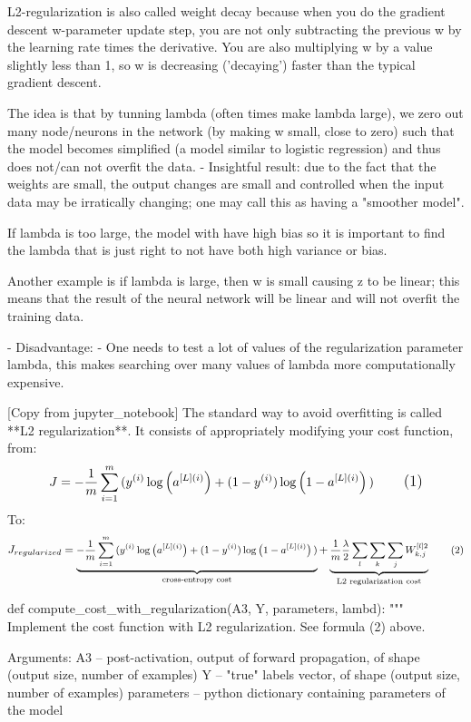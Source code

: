 \documentclass[11pt, onecolumn]{article}
\begin{document}
L2-regularization is also called weight decay because when you do the gradient descent w-parameter update step, you are not only subtracting the previous w by the learning rate times the derivative.  You are also multiplying w by a value slightly less than 1, so w is decreasing ('decaying') faster than the typical gradient descent.

The idea is that by tunning lambda (often times make lambda large), we zero out many node/neurons in the network (by making w small, close to zero) such that the model becomes simplified (a model similar to logistic regression) and thus does not/can not overfit the data.
	- Insightful result: due to the fact that the weights are small, the output changes are small and controlled when the input data may be irratically changing; one may call this as having a "smoother model".
	

If lambda is too large, the model with have high bias so it is important to find the lambda that is just right to not have both high variance or bias.

Another example is if lambda is large, then w is small causing z to be linear; this means that the result of the neural network will be linear and will not overfit the training data.

	- Disadvantage:
		- One needs to test a lot of values of the regularization parameter lambda, this makes searching over many values of lambda more computationally expensive.



[Copy from jupyter_notebook]
The standard way to avoid overfitting is called **L2 regularization**. It consists of appropriately modifying your cost function, from:
$$J = -\frac{1}{m} \sum\limits_{i = 1}^{m} \large{(}\small  y^{(i)}\log\left(a^{[L](i)}\right) + (1-y^{(i)})\log\left(1- a^{[L](i)}\right) \large{)} \tag{1}$$
To:
$$J_{regularized} = \small \underbrace{-\frac{1}{m} \sum\limits_{i = 1}^{m} \large{(}\small y^{(i)}\log\left(a^{[L](i)}\right) + (1-y^{(i)})\log\left(1- a^{[L](i)}\right) \large{)} }_\text{cross-entropy cost} + \underbrace{\frac{1}{m} \frac{\lambda}{2} \sum\limits_l\sum\limits_k\sum\limits_j W_{k,j}^{[l]2} }_\text{L2 regularization cost} \tag{2}$$

def compute_cost_with_regularization(A3, Y, parameters, lambd):
    """
    Implement the cost function with L2 regularization. See formula (2) above.
    
    Arguments:
    A3 -- post-activation, output of forward propagation, of shape (output size, number of examples)
    Y -- "true" labels vector, of shape (output size, number of examples)
    parameters -- python dictionary containing parameters of the model
    
\end{document}
